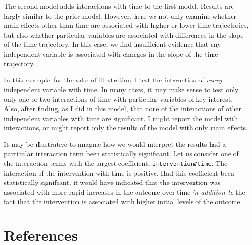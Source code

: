 \documentclass[
  letterpaper,
  DIV=11,
  numbers=noendperiod]{scrreprt}
\begin{document}
The second model adds interactions with time to the first model. Results
are largly similar to the prior model. However, here we not only examine
whether main effects other than time are associated with higher or lower
time trajectories, but also whether particular variables are associated
with differences in the slope of the time trajectory. In this case, we
find insufficient evidence that any independent variable is associated
with changes in the slope of the time trajectory.

\begin{tcolorbox}[enhanced jigsaw, colframe=quarto-callout-tip-color-frame, bottomrule=.15mm, opacitybacktitle=0.6, bottomtitle=1mm, toptitle=1mm, colbacktitle=quarto-callout-tip-color!10!white, arc=.35mm, toprule=.15mm, opacityback=0, rightrule=.15mm, title=\textcolor{quarto-callout-tip-color}{\faLightbulb}\hspace{0.5em}{Which Interactions To Test?}, leftrule=.75mm, colback=white, breakable, coltitle=black, left=2mm, titlerule=0mm]

In this example--for the sake of illustration--I test the interaction of
\emph{every} independent variable with time. In many cases, it may make
sense to test only only one or two interactions of time with particular
variables of key interest. Also, after finding, as I did in this model,
that none of the interactions of other independent variables with time
are significant, I might report the model with interactions, or might
report only the results of the model with only main effects.

\end{tcolorbox}

It may be illustrative to imagine how we would interpret the results had
a particular interaction term been statistically significant. Let us
consider one of the interaction terms with the largest coefficient,
\texttt{intervention\#time}. The interaction of the intervention with
time is positive. Had this coefficient been statistically signifcant, it
would have indicated that the intervention was associated with more
rapid increases in the outcome over time \emph{in addition to} the fact
that the intervention is associated with higher initial levels of the
outcome.


\chapter*{References}\label{references}
\end{document}

